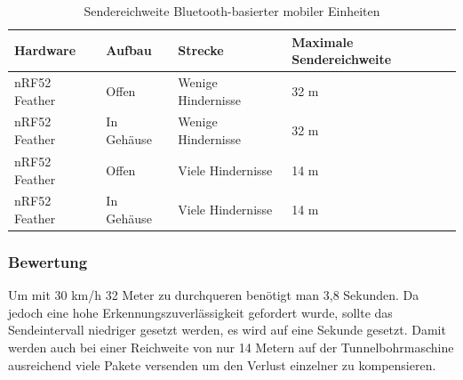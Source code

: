 \begin{table}[h]
	\centering
	\caption{Sendereichweite Bluetooth-basierter mobiler Einheiten}
	\label{table:rangeblue}
	\begin{tabular}{l|l|l|p{3cm}}
		Hardware & Aufbau & Strecke & Maximale Sendereichweite \\
		\hline
		nRF52 Feather & Offen & Wenige Hindernisse & 32 m \\
		nRF52 Feather & In Gehäuse & Wenige Hindernisse & 32 m \\
		nRF52 Feather & Offen & Viele Hindernisse & 14 m \\
		nRF52 Feather & In Gehäuse & Viele Hindernisse & 14 m \\
	\end{tabular}
\end{table}

\subsubsection{Bewertung}
Um mit 30 km/h 32 Meter zu durchqueren benötigt man 3,8 Sekunden.
Da jedoch eine hohe Erkennungszuverlässigkeit gefordert wurde, sollte das Sendeintervall niedriger gesetzt werden, es wird auf eine Sekunde gesetzt.
Damit werden auch bei einer Reichweite von nur 14 Metern auf der Tunnelbohrmaschine ausreichend viele Pakete versenden um den Verlust einzelner zu kompensieren.

